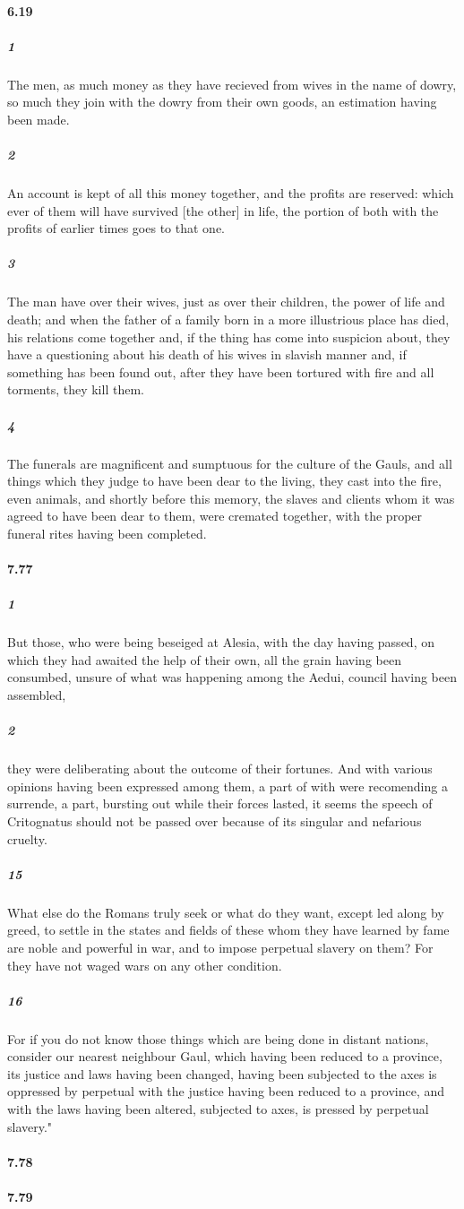 \documentclass[12pt]{article}
\begin{document}
\paragraph{6.19}
\subparagraph{1}
The men, as much money as they have recieved from wives in the name of dowry, so much they join with the dowry from their own goods, an estimation having been made.
\subparagraph{2}
An account is kept of all this money together, and the profits are reserved: which ever of them will have survived [the other] in life, the portion of both with the profits of earlier times goes to that one.
\subparagraph{3}
The man have over their wives, just as over their children, the power of life and death; and when the father of a family born in a more illustrious place has died, his relations come together and, if the thing has come into suspicion about, they have a questioning about his death of his wives in slavish manner and, if something has been found out, after they have been tortured with fire and all torments, they kill them.
\subparagraph{4}
The funerals are magnificent and sumptuous for the culture of the Gauls, and all things which they judge to have been dear to the living, they cast into the fire, even animals, and shortly before this memory, the slaves and clients whom it was agreed to have been dear to them, were cremated together, with the proper funeral rites having been completed.

\paragraph{7.77}
\subparagraph{1}
But those, who were being beseiged at Alesia, with the day having passed, on which they had awaited the help of their own, all the grain having been consumbed, unsure of what was happening among the Aedui, council having been assembled,
\subparagraph{2}
they were deliberating about the outcome of their fortunes. And with various opinions having been expressed among them, a part of with were recomending a surrende, a part, bursting out while their forces lasted, it seems the speech of Critognatus should not be passed over because of its singular and nefarious cruelty.
\subparagraph{15}
What else do the Romans truly seek or what do they want, except led along by greed, to settle in the states and fields of these whom they have learned by fame are noble and powerful in war, and to impose perpetual slavery on them? For they have not waged wars on any other condition.
\subparagraph{16}
For if you do not know those things which are being done in distant nations, consider our nearest neighbour Gaul, which having been reduced to a province, its justice and laws having been changed, having been subjected to the axes is oppressed by perpetual with the justice having been reduced to a province, and with the laws having been altered, subjected to axes, is pressed by perpetual slavery."

\paragraph{7.78}

\paragraph{7.79}
\end{document}
